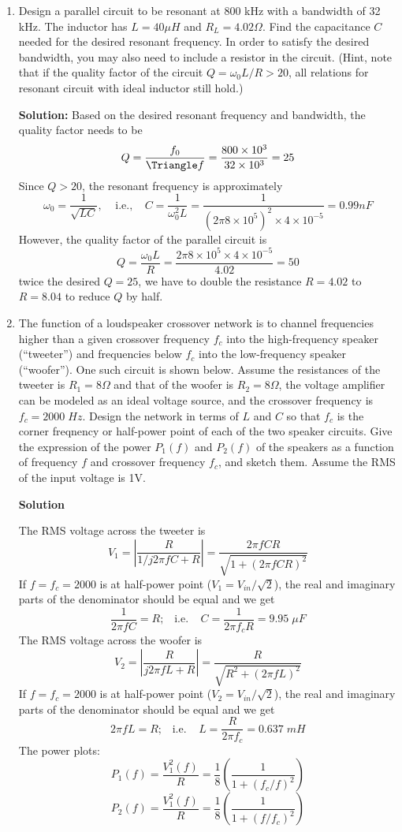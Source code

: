 \begin{enumerate}
\item Design a parallel circuit to be resonant at 800 kHz with a bandwidth
of 32 kHz. The inductor has $L=40 \mu H$ and $R_L=4.02 \Omega$. Find the
capacitance $C$ needed for the desired resonant frequency. In order to
satisfy the desired bandwidth, you may also need to include a resistor 
in the circuit. (Hint, note that if the quality factor of the circuit
$Q=\omega_0 L/R > 20$, all relations for resonant circuit with ideal
inductor still hold.)

{\bf Solution:} Based on the desired resonant frequency and bandwidth, 
the quality factor needs to be
\[ Q=\frac{f_0}{\Triangle f}=\frac{800\times 10^3}{32 \times 10^3}=25 \]
Since $Q>20$, the resonant frequency is approximately
\[ \omega_0=\frac{1}{\sqrt{LC}},\;\;\;\;\mbox{i.e.,}\;\;\;\;
C=\frac{1}{\omega_0^2 L}=\frac{1}{(2\pi 8\times 10^5)^2\times 4\times 10^{-5}}
=0.99 nF \]
However, the quality factor of the parallel circuit is
\[ Q=\frac{\omega_0 L}{R}=\frac{2\pi 8 \times 10^5 \times 4\times 10^{-5}}
	{4.02}=50 \]
twice the desired $Q=25$, we have to double the resistance $R=4.02$ to 
$R=8.04$ to reduce $Q$ by half.

\item The function of a loudspeaker crossover network is to channel 
frequencies higher than a given crossover frequency $f_c$ into the
high-frequency speaker (``tweeter'') and frequencies below $f_c$ into
the low-frequency speaker (``woofer''). One such circuit is shown below.
Assume the resistances of the tweeter is $R_1=8\Omega$ and that of the 
woofer is $R_2=8\Omega$, the voltage amplifier can be modeled as an
ideal voltage source, and the crossover frequency is $f_c=2000\; Hz$.
Design the network in terms of $L$ and $C$ so that $f_c$ is the corner
freqnency or half-power point of each of the two speaker circuits. Give 
the expression of the power $P_1(f)$ and $P_2(f)$ of the speakers as a 
function of frequency $f$ and crossover frequency $f_c$, and sketch them.
Assume the RMS of the input voltage is 1V.


 {\bf Solution}
 
 The RMS voltage across the tweeter is
 \[	V_1=|\frac{R}{1/j2\pi f C+R}|
 	=\frac{2\pi f CR}{\sqrt{1+(2\pi f CR)^2}}	\]
 If $f=f_c=2000$ is at half-power point ($V_1=V_{in}/\sqrt{2}$), the real and
 imaginary parts of the denominator should be equal and we get 
 \[	\frac{1}{2\pi f C}=R;\;\;\;\mbox{i.e.}\;\;\;\;
 	C=\frac{1}{2\pi f_c R}=9.95 \;\mu F	\]
 The RMS voltage across the woofer is
\[	V_2=|\frac{R}{j2\pi f L+R}|
 	=\frac{R}{\sqrt{R^2+(2\pi f L)^2}}	\]
 If $f=f_c=2000$ is at half-power point ($V_2=V_{in}/\sqrt{2}$), the real and
 imaginary parts of the denominator should be equal and we get 
 \[	2\pi f L=R;\;\;\;\mbox{i.e.}\;\;\;\;
 	L=\frac{R}{2\pi f_c}=0.637 \;mH	\]
 The power plots:
 \[	P_1(f)=\frac{V_1^2(f)}{R}=\frac{1}{8}(\frac{1}{1+(f_c/f)^2}) \]
 \[	P_2(f)=\frac{V_1^2(f)}{R}=\frac{1}{8}(\frac{1}{1+(f/f_c)^2}) \]


\end{enumerate}


